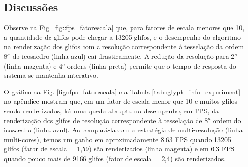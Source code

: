 






\subsection{Discussões}


Observe na Fig. \ref{fig::fps_fatorescala} que, para fatores de escala menores que 10, a quantidade de glifos pode chegar a 13205 glifos, e o desempenho do algoritmo na renderização dos glifos com a resolução correspondente à tesselação da ordem 8$^a$ do icosaedro (linha azul) cai drasticamente. A redução da resolução para 2$^a$ (linha magenta) e 4$^a$ ordens (linha preta) permite que o tempo de resposta do sistema se mantenha interativo.

O gráfico na Fig. \ref{fig::fps_fatorescala} e a Tabela \ref{tab::glyph_info_experiment} no apêndice mostram que, em um fator de escala menor que 10 e muitos glifos sendo renderizados, há uma queda abrupta no desempenho, em FPS, da renderização dos glifos de resolução correspondente à tesselação de 8$^a$ ordem do icosaedro (linha azul). Ao compará-la com a estratégia de multi-resolução (linha multi-cores), temos um ganho em aproximadamente 8,63 FPS quando 13205 glifos (fator de escala = 1,59) são renderizados (linha magenta) e em 6,3 FPS quando pouco mais de 9166 glifos (fator de escala = 2,4) são renderizados.


